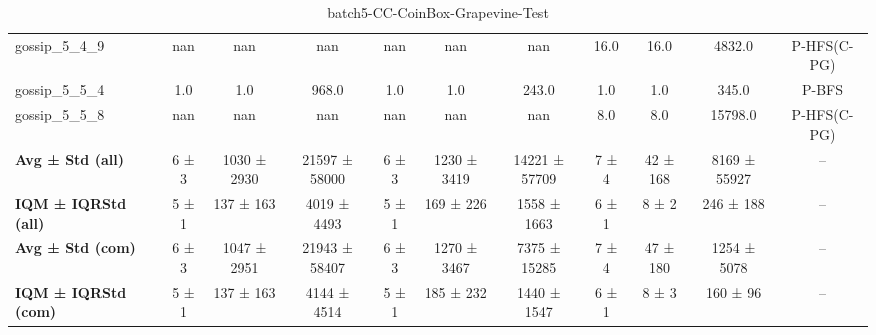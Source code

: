 \begin{table}[!ht]
\begin{tabular}{l|ccc|ccc|cccc}
gossip\_5\_4\_9 & nan & nan & nan & nan & nan & nan & 16.0 & 16.0 & 4832.0 & P-HFS(C-PG) \\
gossip\_5\_5\_4 & 1.0 & 1.0 & 968.0 & 1.0 & 1.0 & 243.0 & 1.0 & 1.0 & 345.0 & P-BFS \\
gossip\_5\_5\_8 & nan & nan & nan & nan & nan & nan & 8.0 & 8.0 & 15798.0 & P-HFS(C-PG) \\
\hline
\textbf{Avg ± Std (all)} & 6 ± 3 & 1030 ± 2930 & 21597 ± 58000 & 6 ± 3 & 1230 ± 3419 & 14221 ± 57709 & 7 ± 4 & 42 ± 168 & 8169 ± 55927 & -- \\
\textbf{IQM ± IQRStd (all)} & 5 ± 1 & 137 ± 163 & 4019 ± 4493 & 5 ± 1 & 169 ± 226 & 1558 ± 1663 & 6 ± 1 & 8 ± 2 & 246 ± 188 & -- \\
\textbf{Avg ± Std (com)} & 6 ± 3 & 1047 ± 2951 & 21943 ± 58407 & 6 ± 3 & 1270 ± 3467 & 7375 ± 15285 & 7 ± 4 & 47 ± 180 & 1254 ± 5078 & -- \\
\textbf{IQM ± IQRStd (com)} & 5 ± 1 & 137 ± 163 & 4144 ± 4514 & 5 ± 1 & 185 ± 232 & 1440 ± 1547 & 6 ± 1 & 8 ± 3 & 160 ± 96 & -- \\
\end{tabular}
\caption{batch5-CC-CoinBox-Grapevine-Test}
\label{tab:batch5_CC-CoinBox-Grapevine_comparison_test}
\end{table}
